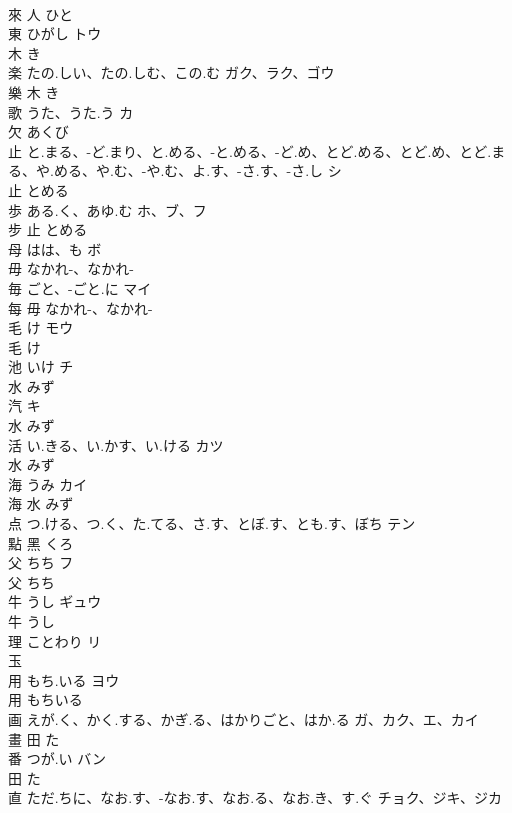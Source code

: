 \documentclass[8pt]{extreport}
\begin{document}
\begin{CJK}{UTF8}{min}
\\	來	人		ひと		
\\	東	ひがし	トウ	
\\	木		き		
\\	楽	たの.しい、たの.しむ、この.む	ガク、ラク、ゴウ	
\\	樂	木		き		
\\	歌	うた、うた.う	カ	
\\	欠		あくび		
\\	止	と.まる、-ど.まり、と.める、-と.める、-ど.め、とど.める、とど.め、とど.まる、や.める、や.む、-や.む、よ.す、-さ.す、-さ.し	シ	
\\	止		とめる		
\\	歩	ある.く、あゆ.む	ホ、ブ、フ	
\\	步	止		とめる		
\\	母	はは、も	ボ	
\\	毋		なかれ-、なかれ-		
\\	毎	ごと、-ごと.に	マイ	
\\	每	毋		なかれ-、なかれ-		
\\	毛	け	モウ	
\\	毛		け		
\\	池	いけ	チ	
\\	水		みず		
\\	汽		キ	
\\	水		みず		
\\	活	い.きる、い.かす、い.ける	カツ	
\\	水		みず		
\\	海	うみ	カイ	
\\	海	水		みず		
\\	点	つ.ける、つ.く、た.てる、さ.す、とぼ.す、とも.す、ぼち	テン	
\\	點	黑		くろ		
\\	父	ちち	フ	
\\	父		ちち		
\\	牛	うし	ギュウ	
\\	牛		うし		
\\	理	ことわり	リ	
\\	玉				
\\	用	もち.いる	ヨウ	
\\	用		もちいる		
\\	画	えが.く、かく.する、かぎ.る、はかりごと、はか.る	ガ、カク、エ、カイ	
\\	畫	田		た		
\\	番	つが.い	バン	
\\	田		た		
\\	直	ただ.ちに、なお.す、-なお.す、なお.る、なお.き、す.ぐ	チョク、ジキ、ジカ	

\end{CJK}
\end{document}

